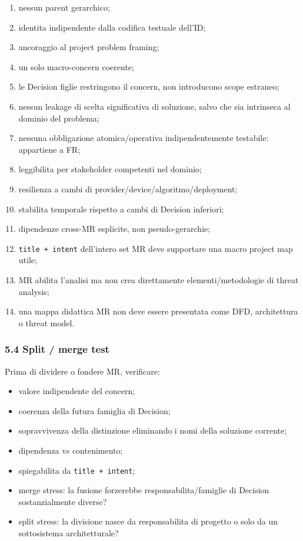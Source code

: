 \documentclass[
  9pt,
  a4paper,
]{article}
\providecommand{\tightlist}{%
  \setlength{\itemsep}{0pt}\setlength{\parskip}{0pt}}
\begin{document}
\begin{enumerate}
\def\labelenumi{\arabic{enumi}.}
\tightlist
\item
  nessun parent gerarchico;
\item
  identita indipendente dalla codifica testuale dell'ID;
\item
  ancoraggio al project problem framing;
\item
  un solo macro-concern coerente;
\item
  le Decision figlie restringono il concern, non introducono scope
  estraneo;
\item
  nessun leakage di scelta significativa di soluzione, salvo che sia
  intrinseca al dominio del problema;
\item
  nessuna obbligazione atomica/operativa indipendentemente testabile:
  appartiene a FR;
\item
  leggibilita per stakeholder competenti nel dominio;
\item
  resilienza a cambi di provider/device/algoritmo/deployment;
\item
  stabilita temporale rispetto a cambi di Decision inferiori;
\item
  dipendenze cross-MR esplicite, non pseudo-gerarchie;
\item
  \texttt{title\ +\ intent} dell'intero set MR deve supportare una macro
  project map utile;
\item
  MR abilita l'analisi ma non crea direttamente elementi/metodologie di
  threat analysis;
\item
  una mappa didattica MR non deve essere presentata come DFD,
  architettura o threat model.
\end{enumerate}

\subsubsection{5.4 Split / merge test}\label{split-merge-test}

Prima di dividere o fondere MR, verificare:

\begin{itemize}
\tightlist
\item
  valore indipendente del concern;
\item
  coerenza della futura famiglia di Decision;
\item
  sopravvivenza della distinzione eliminando i nomi della soluzione
  corrente;
\item
  dipendenza vs contenimento;
\item
  spiegabilita da \texttt{title\ +\ intent};
\item
  merge stress: la fusione forzerebbe responsabilita/famiglie di
  Decision sostanzialmente diverse?
\item
  split stress: la divisione nasce da responsabilita di progetto o solo
  da un sottosistema architetturale?
\end{itemize}
\end{document}
